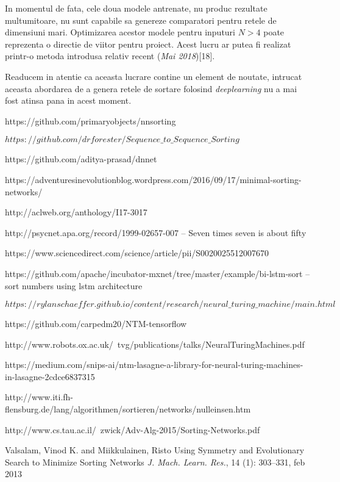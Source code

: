 \documentclass[12pt]{article}
\begin{document}
 In momentul de fata, cele doua modele antrenate, nu produc rezultate multumitoare, nu sunt capabile sa genereze comparatori pentru retele de dimensiuni mari. Optimizarea acestor modele pentru inputuri $N>4$ poate reprezenta o directie de viitor pentru proiect. Acest lucru ar putea fi realizat printr-o metoda introdusa relativ recent (\textit{Mai 2018})[18].

Readucem in atentie ca aceasta lucrare contine un element de noutate, intrucat aceasta abordarea de a genera retele de sortare folosind \textit{deeplearning} nu a mai fost atinsa pana in acest moment. 
  
 


\pagebreak
\begin{thebibliography}{12}
 https://github.com/primaryobjects/nnsorting

$https://github.com/drforester/Sequence\_to\_Sequence\_Sorting$

 https://github.com/aditya-prasad/dnnet

 https://adventuresinevolutionblog.wordpress.com/2016/09/17/minimal-sorting-networks/

 http://aclweb.org/anthology/I17-3017


 http://psycnet.apa.org/record/1999-02657-007 -- Seven times seven is about fifty

 https://www.sciencedirect.com/science/article/pii/S0020025512007670

 https://github.com/apache/incubator-mxnet/tree/master/example/bi-lstm-sort -- sort numbers using lstm architecture 

 $https://rylanschaeffer.github.io/content/research/neural\_turing\_machine/main.html$

 https://github.com/carpedm20/NTM-tensorflow

 http://www.robots.ox.ac.uk/~tvg/publications/talks/NeuralTuringMachines.pdf

 https://medium.com/snips-ai/ntm-lasagne-a-library-for-neural-turing-machines-in-lasagne-2cdce6837315

 http://www.iti.fh-flensburg.de/lang/algorithmen/sortieren/networks/nulleinsen.htm

 http://www.cs.tau.ac.il/~zwick/Adv-Alg-2015/Sorting-Networks.pdf

 Valsalam, Vinod K. and Miikkulainen, Risto
 \newblock Using Symmetry and Evolutionary Search to Minimize Sorting Networks
 \newblock \emph{J. Mach. Learn. Res.}, 14 (1):  303--331, feb 2013


\end{thebibliography}
\end{document}
